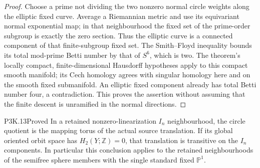 \begin{proof}
Choose a prime not dividing the two nonzero normal circle weights
along the elliptic fixed curve.  Average a Riemannian metric and
use its equivariant normal exponential map; in that neighbourhood
the fixed set of the prime-order subgroup is exactly the zero
section.  Thus the elliptic curve is a connected component of
that finite-subgroup fixed set.  The Smith--Floyd inequality
\cite[Theorem 4.4, p.~146]{Floyd1952} bounds its total mod-prime
Betti number by that of \(S^6\), which is two.  The theorem's
locally compact, finite-dimensional Hausdorff hypotheses apply to
this compact smooth manifold; its Cech homology agrees with
singular homology here and on the smooth fixed submanifold.
An elliptic fixed component already has total Betti number four,
a contradiction.  This proves the
assertion without assuming that the finite descent is unramified
in the normal directions.
\end{proof}

\begin{statement}{P3K.13}{Proved}
In a retained nonzero-linearization \(I_n\) neighbourhood, the
circle quotient is the mapping torus of the actual source
translation.  If its global oriented orbit space has
\(H_2(Y;\mathbb Z)=0\), that translation is transitive on the
\(I_n\) components.  In particular this conclusion applies to
the retained neighbourhoods of the semifree sphere members with
the single standard fixed \(\mathbb P^1\).
\end{statement}

